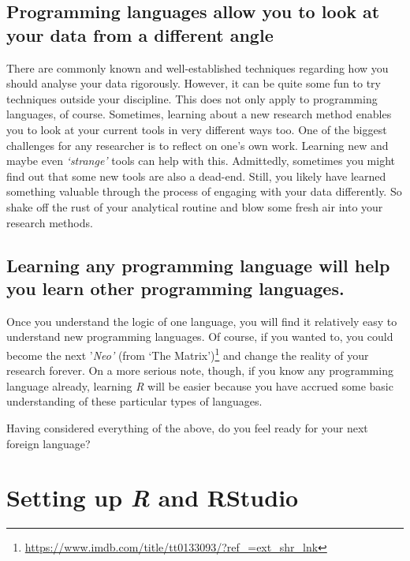 \documentclass[
  letterpaper,
]{krantz}
\renewcommand{\href}[2]{#2\footnote{\url{#1}}}
\begin{document}
\section{Programming languages allow you to look at your data from a
different
angle}\label{sec-programming-languages-allow-you-to-look-at-your-data-from-a-different-angle}

There are commonly known and well-established techniques regarding how
you should analyse your data rigorously. However, it can be quite some
fun to try techniques outside your discipline. This does not only apply
to programming languages, of course. Sometimes, learning about a new
research method enables you to look at your current tools in very
different ways too. One of the biggest challenges for any researcher is
to reflect on one's own work. Learning new and maybe even
\emph{`strange'} tools can help with this. Admittedly, sometimes you
might find out that some new tools are also a dead-end. Still, you
likely have learned something valuable through the process of engaging
with your data differently. So shake off the rust of your analytical
routine and blow some fresh air into your research methods.

\section{Learning any programming language will help you learn other
programming
languages.}\label{sec-learning-any-programming-language-will-help-you-learn-other-programming-languages.}

Once you understand the logic of one language, you will find it
relatively easy to understand new programming languages. Of course, if
you wanted to, you could become the next '\emph{Neo'} (from
\href{https://www.imdb.com/title/tt0133093/?ref_=ext_shr_lnk}{`The
Matrix')} and change the reality of your research forever. On a more
serious note, though, if you know any programming language already,
learning \emph{R} will be easier because you have accrued some basic
understanding of these particular types of languages.

Having considered everything of the above, do you feel ready for your
next foreign language?


\chapter{\texorpdfstring{Setting up \emph{R} and
RStudio}{Setting up R and RStudio}}\label{sec-setting-up-r-and-rstudio}
\end{document}
